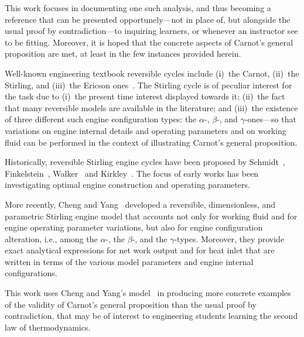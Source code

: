     This work focuses in documenting one such analysis, and thus becoming a reference  that  can
    be  presented  opportunely---not  in  place  of,  but   alongside   the   usual   proof   by
    contradiction---to inquiring  learners,  or  whenever  an  instructor  see  to  be  fitting.
    Moreover, it is hoped that the concrete aspects of Carnot's general proposition are met,  at
    least in the few instances provided herein.

    Well-known engineering textbook reversible cycles include (i)~the Carnot, (ii)~the Stirling,
    and (iii)~the Ericson  ones~\cite{2013-CengelYA+BolesMA-AMGH}.  The  Stirling  cycle  is  of
    peculiar interest for the task due to (i)~the present time interest  displayed  towards  it;
    (ii)~the fact that many reversible models are available in  the  literature;  and  (iii)~the
    existence of three different such engine configuration types: the $\alpha$-,  $\beta$-,  and
    $\gamma$-ones---so that variations on engine internal details and operating  parameters  and
    on working  fluid  can  be  performed  in  the  context  of  illustrating  Carnot's  general
    proposition.

    Historically,   reversible    Stirling    engine    cycles    have    been    proposed    by
    Schmidt~\cite{1871-SchmidtG-ZeitVerDeutschIng},                                             
    Finkelstein~\cite{1960-FinkelsteinT-SAEIntl},   Walker~\cite{1962-WalkerG-JMechEngSci}   and
    Kirkley~\cite{1962-KirkleyDW-JMechEngSci}. The focus of early works has  been  investigating
    optimal engine construction and operating parameters.

    More recently, Cheng and Yang~\cite{2012-ChengCH+YangHS-ApEnergy}  developed  a  reversible,
    dimensionless, and parametric Stirling engine model that accounts not only for working fluid
    and for engine operating parameter variations, but also for engine configuration alteration,
    i.e., among the $\alpha$-, the $\beta$-, and  the  $\gamma$-types.  Moreover,  they  provide
    exact analytical expressions for net work output and for heat  inlet  that  are  written  in
    terms of the various model parameters and engine internal configurations.

    This work uses Cheng and Yang's model~\cite{2012-ChengCH+YangHS-ApEnergy} in producing  more
    concrete examples of the validity of Carnot's general proposition than the  usual  proof  by
    contradiction, that may be of interest to engineering students learning the  second  law  of
    thermodynamics.



